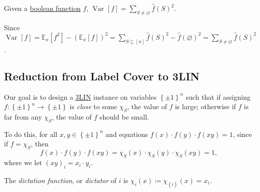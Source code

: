 \begin{claim}
	Given a \hyperref[def:boolean-function]{boolean function} \(f\), \(\mathop{\mathrm{Var}}\nolimits_{}\left[f \right] = \sum_{S \neq \varnothing } \hat{f} (S)^{2}  \).
\end{claim}
\begin{explanation}
	Since \(\mathop{\mathrm{Var}}\nolimits_{}\left[f \right]
	= \mathbb{E}_{x}\left[f^2 \right] - \left( \mathbb{E}_{x}\left[f \right]  \right) ^2
	= \sum_{S \subseteq [n]} \hat{f} (S)^2 - \hat{f} (\varnothing )^2
	= \sum_{S \neq \varnothing } \hat{f} (S)^2\).
\end{explanation}

\subsection{Reduction from Label Cover to 3LIN}
Our goal is to design a \hyperref[prb:max-3LIN]{3LIN} instance on variables \(\left\{ \pm 1 \right\} ^n\) such that if assigning \(f\colon \left\{ \pm 1 \right\} ^n \to  \left\{ \pm 1 \right\} \) is \emph{close} to some \(\chi _S\), the value of \(f\) is large; otherwise if \(f\) is far from any \(\chi _S\), the value of \(f\) should be small.

To do this, for all \(x, y\in \left\{ \pm 1 \right\} ^n\) and equations \(f(x) \cdot f(y) \cdot f(xy) = 1\), since if \(f = \chi _S\), then
\[
	f(x) \cdot f(y) \cdot f(xy) = \chi _S(x) \cdot \chi _S(y) \cdot \chi _S(xy) = 1,
\]
where we let \((xy)_i = x_i \cdot y_i\).


\begin{notation}
	The \emph{dictation function}, or \emph{dictator} of \(i\) is \(\chi _i(x) \coloneqq \chi _{\left\{ i \right\} } (x) = x_i\).
\end{notation}

